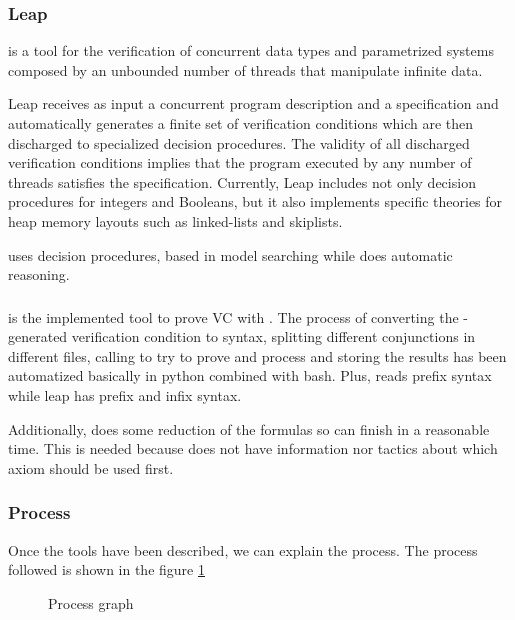 \subsubsection{Leap}

\leap is a tool for the verification of concurrent data types and parametrized systems composed by an unbounded number of threads that manipulate infinite data.

Leap receives as input a concurrent program description and a specification and automatically generates a finite set of verification conditions which are then discharged to specialized decision procedures. 
%
The validity of all discharged verification conditions implies that the program executed by any number of threads satisfies the specification. 
%
Currently, Leap includes not only decision procedures for integers and Booleans, but it also implements specific theories for heap memory layouts such as linked-lists and skiplists.

\leap uses decision procedures, based in model searching while \spass does automatic reasoning. 



\subsubsection{\gandalf}

\gandalf is the implemented tool to prove \gls{VC} with \spass. 
%
The process of converting the \leap-generated verification condition to \spass syntax, splitting different conjunctions in different files, calling \spass to try to prove and process and storing the results has been automatized basically in python combined with bash.
Plus, \spass reads prefix syntax while leap has prefix and infix syntax.

Additionally, \gandalf does some reduction of the formulas so \spass can finish in a reasonable time.
%
This is needed because \spass does not have information nor tactics about which axiom should be used first.



\subsubsection{Process}

Once the tools have been described, we can explain the process. 
%
The process followed is shown in the figure \ref{fig:process}


\begin{figure}

\caption{Process graph}
\label{fig:process}
\end{figure}

